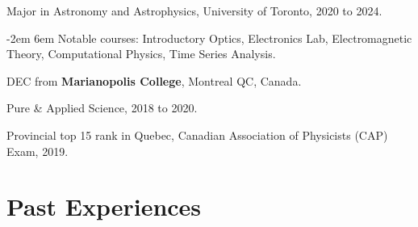 \documentclass{article}
\newcommand{\cvsection}[1]{\section*{\rmfamily#1}}
\begin{document}
\hspace{2em} Major in Astronomy and Astrophysics, University of Toronto, 2020 to 2024.

{\parindent -2em
\leftskip 6em 
Notable courses: Introductory Optics, Electronics Lab, Electromagnetic Theory, Computational Physics, Time Series Analysis.

}

DEC from \textbf{Marianopolis College}, Montreal QC, Canada.

\hspace{2em} Pure \& Applied Science, 2018 to 2020.

\hspace{2em} Provincial top 15 rank in Quebec, Canadian Association of Physicists (CAP) Exam, 2019.

\noindent
\cvsection{Past Experiences}
\end{document}
